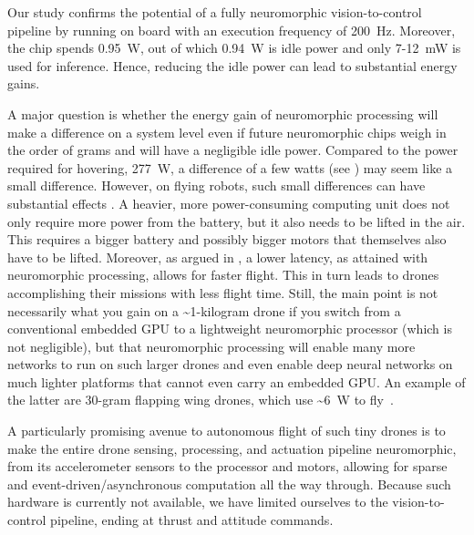 Our study confirms the potential of a fully neuromorphic vision-to-control pipeline by running on board with an execution frequency of 200~Hz. Moreover, the chip spends 0.95~W, out of which 0.94~W is idle power and only 7-12~mW is used for inference. Hence, reducing the idle power can lead to substantial energy gains. 

A major question is whether the energy gain of neuromorphic processing will make a difference on a system level even if future neuromorphic chips weigh in the order of grams and will have a negligible idle power. Compared to the power required for hovering, 277~W, a difference of a few watts (see ) may seem like a small difference. However, on flying robots, such small differences can have substantial effects \cite{boroujerdian2018mavbench}. A heavier, more power-consuming computing unit does not only require more power from the battery, but it also needs to be lifted in the air. This requires a bigger battery and possibly bigger motors that themselves also have to be lifted. Moreover, as argued in \cite{boroujerdian2018mavbench}, a lower latency, as attained with neuromorphic processing, allows for faster flight. This in turn leads to drones accomplishing their missions with less flight time. Still, the main point is not necessarily what you gain on a \textasciitilde{}1-kilogram drone if you switch from a conventional embedded GPU to a lightweight neuromorphic processor (which is not negligible), but that neuromorphic processing will enable many more networks to run on such larger drones and even enable deep neural networks on much lighter platforms that cannot even carry an embedded GPU. An example of the latter are 30-gram flapping wing drones, which use \textasciitilde{}6~W to fly~\cite{karasek2018tailless}. 

A particularly promising avenue to autonomous flight of such tiny drones is to make the entire drone sensing, processing, and actuation pipeline neuromorphic, from its accelerometer sensors to the processor and motors, allowing for sparse and event-driven/asynchronous computation all the way through. Because such hardware is currently not available, we have limited ourselves to the vision-to-control pipeline, ending at thrust and attitude commands.

